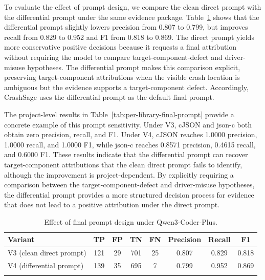 \documentclass[pdflatex,sn-basic]{sn-jnl}%
\renewcommand{\arraystretch}{1.16}%
\theoremstyle{thmstyleone}%
\theoremstyle{thmstyletwo}%
\theoremstyle{thmstylethree}%
\begin{document}
To evaluate the effect of prompt design, we compare the clean direct prompt with the differential prompt under the same evidence package. Table~\ref{tab:prompt-form-ablation} shows that the differential prompt slightly lowers precision from 0.807 to 0.799, but improves recall from 0.829 to 0.952 and F1 from 0.818 to 0.869. The direct prompt yields more conservative positive decisions because it requests a final attribution without requiring the model to compare target-component-defect and driver-misuse hypotheses. The differential prompt makes this comparison explicit, preserving target-component attributions when the visible crash location is ambiguous but the evidence supports a target-component defect. Accordingly, CrashSage uses the differential prompt as the default final prompt.

The project-level results in Table~\ref{tab:per-library-final-prompt} provide a concrete example of this prompt sensitivity. Under V3, cJSON and json-c both obtain zero precision, recall, and F1. Under V4, cJSON reaches 1.0000 precision, 1.0000 recall, and 1.0000 F1, while json-c reaches 0.8571 precision, 0.4615 recall, and 0.6000 F1. These results indicate that the differential prompt can recover target-component attributions that the clean direct prompt fails to identify, although the improvement is project-dependent. By explicitly requiring a comparison between the target-component-defect and driver-misuse hypotheses, the differential prompt provides a more structured decision process for evidence that does not lead to a positive attribution under the direct prompt.

\begin{table}[!htbp]
\caption{Effect of final prompt design under Qwen3-Coder-Plus.}
\label{tab:prompt-form-ablation}
\centering
\scriptsize
\setlength{\tabcolsep}{3.2pt}
\renewcommand{\arraystretch}{1.12}
\begin{tabular*}{\linewidth}{@{\extracolsep{\fill}}lccccccc}
\toprule
\textbf{Variant} & \textbf{TP} & \textbf{FP} & \textbf{TN} & \textbf{FN} & \textbf{Precision} & \textbf{Recall} & \textbf{F1} \\
\midrule
V3 (clean direct prompt) & 121 & 29 & 701 & 25 & 0.807 & 0.829 & 0.818 \\
V4 (differential prompt) & 139 & 35 & 695 & 7 & 0.799 & 0.952 & 0.869 \\
\botrule
\end{tabular*}
\end{table}
\end{document}
